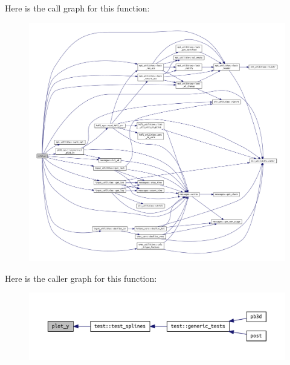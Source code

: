 Here is the call graph for this function\+:\nopagebreak
\begin{figure}[H]
\begin{center}
\leavevmode
\includegraphics[width=350pt]{test_8f90_a197914f99b7e194fb4bca9ca3669e0e8_cgraph}
\end{center}
\end{figure}
Here is the caller graph for this function\+:\nopagebreak
\begin{figure}[H]
\begin{center}
\leavevmode
\includegraphics[width=350pt]{test_8f90_a197914f99b7e194fb4bca9ca3669e0e8_icgraph}
\end{center}
\end{figure}

